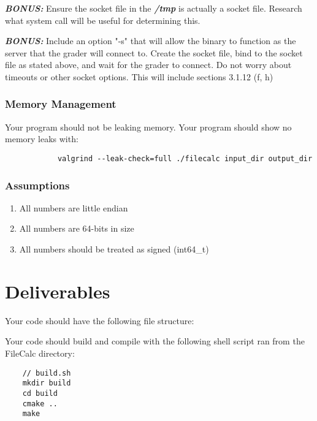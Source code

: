 \documentclass[letterpaper,12pt]{article}
\begin{document}
	\textbf{\emph{BONUS:}} Ensure the socket file in the \textbf{\emph{/tmp}} is actually a socket file. Research what system call will be useful for determining this.
	
	\textbf{\emph{BONUS:}} Include an option "-s" that will allow the binary to function as the server that the grader will connect to. Create the socket file, bind to the socket file as stated above, and wait for the grader to connect. Do not worry about timeouts or other socket options. This will include sections 3.1.12 (f, h)
	
	\subsubsection{Memory Management}
	Your program should not be leaking memory. Your program should show no memory leaks with:
		\begin{lstlisting}
			valgrind --leak-check=full ./filecalc input_dir output_dir 
		\end{lstlisting}
	
	\subsubsection{Assumptions}
		\begin{enumerate}
			\item All numbers are little endian
			\item All numbers are 64-bits in size
			\item All numbers should be treated as signed (int64\_t)
		\end{enumerate}
	
	\section{Deliverables}
	Your code should have the following file structure:
	\hfill

	Your code should build and compile with the following shell script ran from the FileCalc directory:

	\begin{lstlisting}
	// build.sh
	mkdir build
	cd build
	cmake .. 
	make
	\end{lstlisting}
	
	
\end{document}
